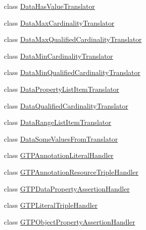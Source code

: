 \begin{DoxyCompactItemize}
\item 
class \hyperlink{classorg_1_1coode_1_1owlapi_1_1rdfxml_1_1parser_1_1_data_has_value_translator}{Data\-Has\-Value\-Translator}
\item 
class \hyperlink{classorg_1_1coode_1_1owlapi_1_1rdfxml_1_1parser_1_1_data_max_cardinality_translator}{Data\-Max\-Cardinality\-Translator}
\item 
class \hyperlink{classorg_1_1coode_1_1owlapi_1_1rdfxml_1_1parser_1_1_data_max_qualified_cardinality_translator}{Data\-Max\-Qualified\-Cardinality\-Translator}
\item 
class \hyperlink{classorg_1_1coode_1_1owlapi_1_1rdfxml_1_1parser_1_1_data_min_cardinality_translator}{Data\-Min\-Cardinality\-Translator}
\item 
class \hyperlink{classorg_1_1coode_1_1owlapi_1_1rdfxml_1_1parser_1_1_data_min_qualified_cardinality_translator}{Data\-Min\-Qualified\-Cardinality\-Translator}
\item 
class \hyperlink{classorg_1_1coode_1_1owlapi_1_1rdfxml_1_1parser_1_1_data_property_list_item_translator}{Data\-Property\-List\-Item\-Translator}
\item 
class \hyperlink{classorg_1_1coode_1_1owlapi_1_1rdfxml_1_1parser_1_1_data_qualified_cardinality_translator}{Data\-Qualified\-Cardinality\-Translator}
\item 
class \hyperlink{classorg_1_1coode_1_1owlapi_1_1rdfxml_1_1parser_1_1_data_range_list_item_translator}{Data\-Range\-List\-Item\-Translator}
\item 
class \hyperlink{classorg_1_1coode_1_1owlapi_1_1rdfxml_1_1parser_1_1_data_some_values_from_translator}{Data\-Some\-Values\-From\-Translator}
\item 
class \hyperlink{classorg_1_1coode_1_1owlapi_1_1rdfxml_1_1parser_1_1_g_t_p_annotation_literal_handler}{G\-T\-P\-Annotation\-Literal\-Handler}
\item 
class \hyperlink{classorg_1_1coode_1_1owlapi_1_1rdfxml_1_1parser_1_1_g_t_p_annotation_resource_triple_handler}{G\-T\-P\-Annotation\-Resource\-Triple\-Handler}
\item 
class \hyperlink{classorg_1_1coode_1_1owlapi_1_1rdfxml_1_1parser_1_1_g_t_p_data_property_assertion_handler}{G\-T\-P\-Data\-Property\-Assertion\-Handler}
\item 
class \hyperlink{classorg_1_1coode_1_1owlapi_1_1rdfxml_1_1parser_1_1_g_t_p_literal_triple_handler}{G\-T\-P\-Literal\-Triple\-Handler}
\item 
class \hyperlink{classorg_1_1coode_1_1owlapi_1_1rdfxml_1_1parser_1_1_g_t_p_object_property_assertion_handler}{G\-T\-P\-Object\-Property\-Assertion\-Handler}

\end{DoxyCompactItemize}
